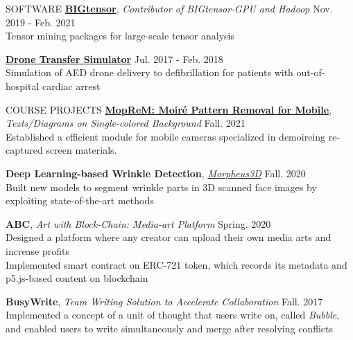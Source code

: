 \documentclass[12pt]{resume} %
\begin{document}
\begin{rSection}{SOFTWARE}
\href{https://datalab.snu.ac.kr/bigtensor/}{\bf BIGtensor},
\textit{Contributor of BIGtensor-GPU and Hadoop} \hfill Nov. 2019 - Feb. 2021 \\ 
Tensor mining packages for large-scale tensor analysis

\href{https://github.com/rubis-lab/DroneTransferSimulator/}{\bf Drone Transfer Simulator}  \hfill Jul. 2017 - Feb. 2018 \\
Simulation of AED drone delivery to defibrillation for patients with out-of-hospital cardiac arrest
\end{rSection}

\begin{rSection}{COURSE PROJECTS}
{\bf \href{https://github.com/snucvpip/MopReM}{MopReM: Moiré Pattern Removal for Mobile}}, \textit{Texts/Diagrams on Single-colored Background} \hfill Fall. 2021\\
Established a efficient module for mobile cameras specialized in demoireing re-captured screen materials.

{\bf Deep Learning-based Wrinkle Detection}, \href{https://morpheus3d.co.kr/}{\textit{Morpheus3D}} \hfill Fall. 2020\\
Built new models to segment wrinkle parts in 3D scanned face images by exploiting state-of-the-art methods 

{\bf ABC}, \textit{Art with Block-Chain: Media-art Platform} \hfill Spring. 2020\\
Designed a platform where any creator can upload their own media arts and increase profits \\
Implemented smart contract on ERC-721 token, which records its metadata and p5.js-based content on blockchain

{\bf BusyWrite}, \textit{Team Writing Solution to Accelerate Collaboration} \hfill Fall. 2017\\
Implemented a concept of a unit of thought that users write on, called \textit{Bubble}, 
and enabled users to write simultaneously and merge after resolving conflicts

\end{rSection}
\end{document}
